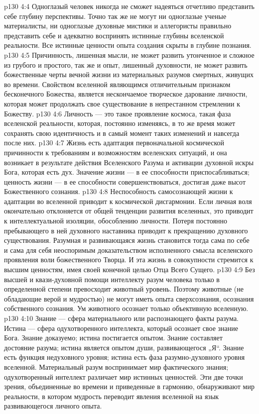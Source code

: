 \vs p130 4:4 Одноглазый человек никогда не сможет надеяться отчетливо представить себе глубину перспективы. Точно так же не могут ни одноглазые ученые материалисты, ни одноглазые духовные мистики и аллегористы правильно представить себе и адекватно воспринять истинные глубины вселенской реальности. Все истинные ценности опыта создания скрыты в глубине познания.
\vs p130 4:5 Причинность, лишенная мысли, не может развить утонченное и сложное из грубого и простого, так же и опыт, лишенный духовности, не может развить божественные черты вечной жизни из материальных разумов смертных, живущих во времени. Свойством вселенной являющимся отличительным признаком бесконечного Божества, является нескончаемое творческое дарование личности, которая может продолжать свое существование в непрестанном стремлении к Божеству.
\vs p130 4:6 Личность --- это такое проявление космоса, такая фаза вселенской реальности, которая, постоянно изменяясь, в то же время может сохранять свою идентичность и в самый момент таких изменений и навсегда после них.
\vs p130 4:7 Жизнь есть адаптация первоначальной космической причинности к требованиям и возможностям вселенских ситуаций, и она возникает в результате действия Вселенского Разума и активации духовной искры Бога, которая есть дух. Значение жизни --- в ее способности приспосабливаться; ценность жизни --- в ее способности совершенствоваться, достигая даже высот Божественного сознания.
\vs p130 4:8 Неспособность самосознающей жизни к адаптации во вселенной приводит к космической дисгармонии. Если личная воля окончательно отклоняется от общей тенденции развития вселенных, это приводит к интеллектуальной изоляции, обособлению личности. Потеря постоянно пребывающего в ней духовного наставника приводит к прекращению духовного существования. Разумная и развивающаяся жизнь становится тогда сама по себе и сама для себя неоспоримым доказательством исполненного смысла вселенского проявления воли божественного Творца. И эта жизнь в совокупности стремится к высшим ценностям, имея своей конечной целью Отца Всего Сущего.
\vs p130 4:9 Без высшей и квази\hyp{}духовной помощи интеллекту разум человека только в определенной степени превосходит животный уровень. Поэтому животные (не обладающие верой и мудростью) не могут иметь опыта сверхсознания, осознания собственного сознания. Ум животного осознает только объективную вселенную.
\vs p130 4:10 Знание --- сфера материального или распознающего факты разума. Истина --- сфера одухотворенного интеллекта, который осознает свое знание Бога. Знание доказуемо; истина постигается опытом. Знание составляет достояние разума; истина является опытом души, развивающегося „Я“. Знание есть функция недуховного уровня; истина есть фаза разумно\hyp{}духовного уровня вселенной. Материальный разум воспринимает мир фактического знания; одухотворенный интеллект различает мир истинных ценностей. Эти две точки зрения, объединенные во времени и приведенные в гармонию, обнаруживают мир реальности, в котором мудрость переводит явления вселенной на язык развивающегося личного опыта.
